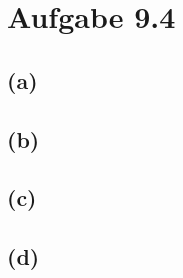 \documentclass[12pt]{article}
\begin{document}
\section{Aufgabe 9.4}
\subsection{(a)}
\subsection{(b)}
\subsection{(c)}
\subsection{(d)}
\end{document}
